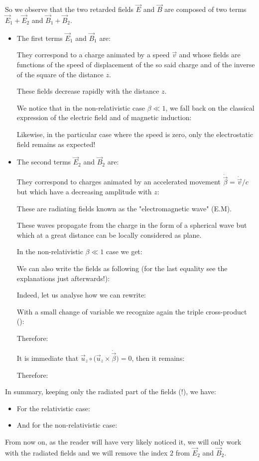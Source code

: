 	So we observe that the two retarded fields $\vec{E}$ and $\vec{B}$ are composed of two terms $\vec{E}_1+\vec{E}_2$ and $\vec{B}_1+\vec{B}_2$.
	\begin{itemize}
		\item The first terms $\vec{E}_1$ and $\vec{B}_1$ are:
		
		They correspond to a charge animated by a speed $\vec{v}$ and whose fields are functions of the speed of displacement of the so said charge and of the inverse of the square of the distance $z$.
		
		These fields decrease rapidly with the distance $z$.
		
		We notice that in the non-relativistic case $\beta \ll 1$, we fall back on the classical expression of the electric field and of magnetic induction:
		
		Likewise, in the particular case where the speed is zero, only the electrostatic field remains as expected!
		
		\item The second terms $\vec{E}_2$ and $\vec{B}_2$ are:
		
		They correspond to charges animated by an accelerated movement $\dot{\vec{\beta}}=\dot{\vec{v}}/c$  but which have a decreasing amplitude with $z$:
		
		These are radiating fields known as the "electromagnetic wave" (E.M).
		
		These waves propagate from the charge in the form of a spherical wave but which at a great distance can be locally considered as plane.
		
		In the non-relativistic $\beta\ll 1$ case we get:
		
		We can also write the fields as following (for the last equality see the explanations just afterwards!):
		
		Indeed, let us analyse how we can rewrite:
		
		With a small change of variable we recognize again the triple cross-product ():
		
		Therefore:
		
		It is immediate that $\vec{u}_z\circ \big(\vec{u}_z\times\dot{\vec{\beta}}\big)=0$, then it remains:
		
		Therefore:
		
	\end{itemize}
	In summary, keeping only the radiated part of the fields (!), we have:
	\begin{itemize}
		\item For the relativistic case:
		
		
		\item And for the non-relativistic case:
		
	\end{itemize}
	From now on, as the reader will have very likely noticed it, we will only work with the radiated fields and we will remove the index $2$ from $\vec{E}_2$ and $\vec{B}_2$.
	

